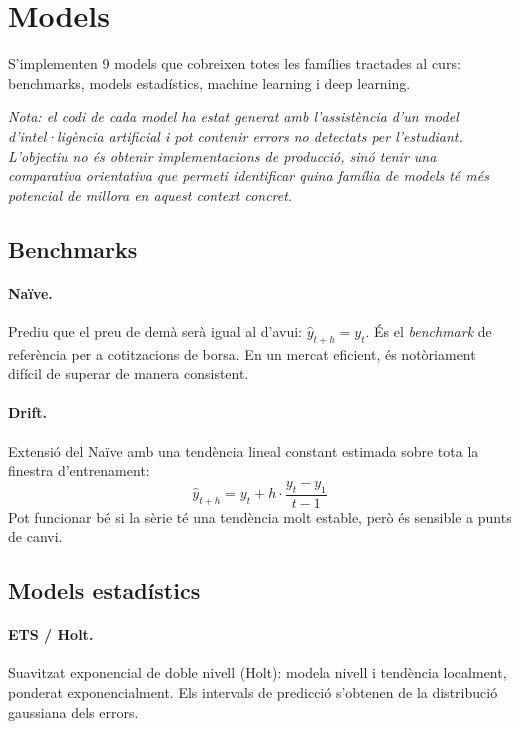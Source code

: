 \documentclass[12pt,a4paper]{article}
\begin{document}
\section{Models}

S'implementen 9 models que cobreixen totes les famílies tractades al curs: benchmarks,
models estadístics, machine learning i deep learning.

\textit{Nota: el codi de cada model ha estat generat amb l'assistència d'un model d'intel·ligència
artificial i pot contenir errors no detectats per l'estudiant. L'objectiu no és obtenir
implementacions de producció, sinó tenir una comparativa orientativa que permeti identificar
quina família de models té més potencial de millora en aquest context concret.}

\subsection{Benchmarks}

\paragraph{Naïve.} Prediu que el preu de demà serà igual al d'avui: $\hat{y}_{t+h} = y_t$.
És el \textit{benchmark} de referència per a cotitzacions de borsa. En un mercat eficient,
és notòriament difícil de superar de manera consistent.

\paragraph{Drift.} Extensió del Naïve amb una tendència lineal constant estimada
sobre tota la finestra d'entrenament:
\[
  \hat{y}_{t+h} = y_t + h \cdot \frac{y_t - y_1}{t - 1}
\]
Pot funcionar bé si la sèrie té una tendència molt estable, però és sensible a punts de canvi.

\subsection{Models estadístics}

\paragraph{ETS / Holt.} Suavitzat exponencial de doble nivell (Holt): modela nivell
i tendència localment, ponderat exponencialment. Els intervals de predicció s'obtenen
de la distribució gaussiana dels errors.
\end{document}
